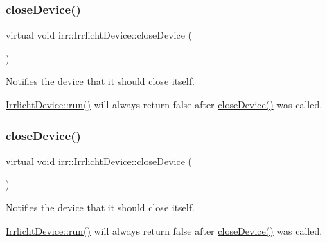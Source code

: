 \subsubsection{\texorpdfstring{close\+Device()}{closeDevice()}\hspace{0.1cm}{\footnotesize\ttfamily [1/3]}}
{\footnotesize\ttfamily virtual void irr\+::\+Irrlicht\+Device\+::close\+Device (\begin{DoxyParamCaption}{ }\end{DoxyParamCaption})\hspace{0.3cm}{\ttfamily [pure virtual]}}



Notifies the device that it should close itself. 

\hyperlink{classirr_1_1IrrlichtDevice_a0489f8151dc43f6f41503ffb5a160b35}{Irrlicht\+Device\+::run()} will always return false after \hyperlink{classirr_1_1IrrlichtDevice_a08c97937e0f60f98d443b397a7c60e18}{close\+Device()} was called. \mbox{\label{classirr_1_1IrrlichtDevice_a08c97937e0f60f98d443b397a7c60e18}} 
\subsubsection{\texorpdfstring{close\+Device()}{closeDevice()}\hspace{0.1cm}{\footnotesize\ttfamily [2/3]}}
{\footnotesize\ttfamily virtual void irr\+::\+Irrlicht\+Device\+::close\+Device (\begin{DoxyParamCaption}{ }\end{DoxyParamCaption})\hspace{0.3cm}{\ttfamily [pure virtual]}}



Notifies the device that it should close itself. 

\hyperlink{classirr_1_1IrrlichtDevice_a0489f8151dc43f6f41503ffb5a160b35}{Irrlicht\+Device\+::run()} will always return false after \hyperlink{classirr_1_1IrrlichtDevice_a08c97937e0f60f98d443b397a7c60e18}{close\+Device()} was called. \mbox{\label{classirr_1_1IrrlichtDevice_a08c97937e0f60f98d443b397a7c60e18}} 

